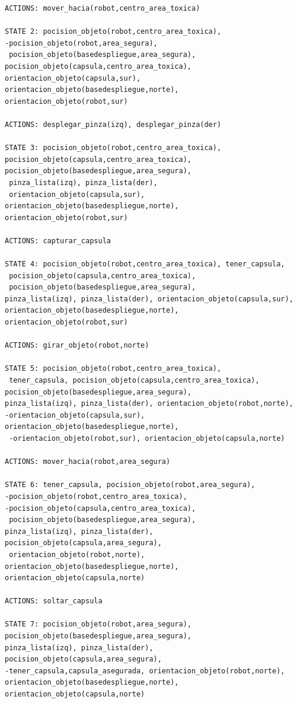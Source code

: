 \documentclass[letterpaper ,10pt]{article}
\begin{document}
{{{{{{\begin{lstlisting}
ACTIONS: mover_hacia(robot,centro_area_toxica)

STATE 2: pocision_objeto(robot,centro_area_toxica), 
-pocision_objeto(robot,area_segura),
 pocision_objeto(basedespliegue,area_segura), 
pocision_objeto(capsula,centro_area_toxica), orientacion_objeto(capsula,sur),
orientacion_objeto(basedespliegue,norte), orientacion_objeto(robot,sur)

ACTIONS: desplegar_pinza(izq), desplegar_pinza(der)

STATE 3: pocision_objeto(robot,centro_area_toxica), 
pocision_objeto(capsula,centro_area_toxica), 
pocision_objeto(basedespliegue,area_segura),
 pinza_lista(izq), pinza_lista(der),
 orientacion_objeto(capsula,sur), 
orientacion_objeto(basedespliegue,norte), orientacion_objeto(robot,sur)

ACTIONS: capturar_capsula

STATE 4: pocision_objeto(robot,centro_area_toxica), tener_capsula,
 pocision_objeto(capsula,centro_area_toxica),
 pocision_objeto(basedespliegue,area_segura), 
pinza_lista(izq), pinza_lista(der), orientacion_objeto(capsula,sur), 
orientacion_objeto(basedespliegue,norte), orientacion_objeto(robot,sur)

ACTIONS: girar_objeto(robot,norte)

STATE 5: pocision_objeto(robot,centro_area_toxica),
 tener_capsula, pocision_objeto(capsula,centro_area_toxica),
pocision_objeto(basedespliegue,area_segura),
pinza_lista(izq), pinza_lista(der), orientacion_objeto(robot,norte),
-orientacion_objeto(capsula,sur), orientacion_objeto(basedespliegue,norte),
 -orientacion_objeto(robot,sur), orientacion_objeto(capsula,norte)

ACTIONS: mover_hacia(robot,area_segura)

STATE 6: tener_capsula, pocision_objeto(robot,area_segura), 
-pocision_objeto(robot,centro_area_toxica), 
-pocision_objeto(capsula,centro_area_toxica),
 pocision_objeto(basedespliegue,area_segura), 
pinza_lista(izq), pinza_lista(der), pocision_objeto(capsula,area_segura),
 orientacion_objeto(robot,norte), orientacion_objeto(basedespliegue,norte), 
orientacion_objeto(capsula,norte)

ACTIONS: soltar_capsula

STATE 7: pocision_objeto(robot,area_segura), 
pocision_objeto(basedespliegue,area_segura), 
pinza_lista(izq), pinza_lista(der), pocision_objeto(capsula,area_segura), 
-tener_capsula,capsula_asegurada, orientacion_objeto(robot,norte),
orientacion_objeto(basedespliegue,norte), orientacion_objeto(capsula,norte)


\end{lstlisting}}}}}}}
\end{document}
